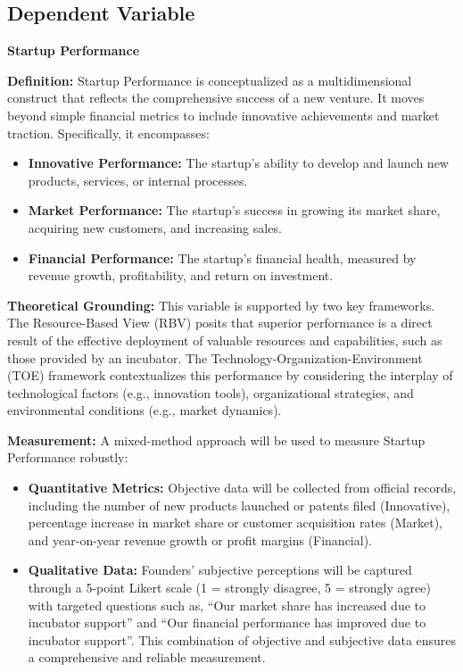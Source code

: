 \documentclass[../Main.tex]{subfiles}
\begin{document}
    \subsection{Dependent Variable}
    
    \textbf{Startup Performance}
    
    \textbf{Definition:} Startup Performance is conceptualized as a multidimensional construct that reflects the comprehensive success of a new venture. It moves beyond simple financial metrics to include innovative achievements and market traction. Specifically, it encompasses:
    
    \begin{itemize}
        \item \textbf{Innovative Performance:} The startup's ability to develop and launch new products, services, or internal processes.
        \item \textbf{Market Performance:} The startup's success in growing its market share, acquiring new customers, and increasing sales.
        \item \textbf{Financial Performance:} The startup's financial health, measured by revenue growth, profitability, and return on investment.
    \end{itemize}
    
    \textbf{Theoretical Grounding:} This variable is supported by two key frameworks. The Resource-Based View (RBV) posits that superior performance is a direct result of the effective deployment of valuable resources and capabilities, such as those provided by an incubator. The Technology-Organization-Environment (TOE) framework contextualizes this performance by considering the interplay of technological factors (e.g., innovation tools), organizational strategies, and environmental conditions (e.g., market dynamics).
    
    \textbf{Measurement:} A mixed-method approach will be used to measure Startup Performance robustly:
    
    \begin{itemize}
        \item \textbf{Quantitative Metrics:} Objective data will be collected from official records, including the number of new products launched or patents filed (Innovative), percentage increase in market share or customer acquisition rates (Market), and year-on-year revenue growth or profit margins (Financial).
        \item \textbf{Qualitative Data:} Founders' subjective perceptions will be captured through a 5-point Likert scale (1 = strongly disagree, 5 = strongly agree) with targeted questions such as, ``Our market share has increased due to incubator support'' and ``Our financial performance has improved due to incubator support''. This combination of objective and subjective data ensures a comprehensive and reliable measurement.
    \end{itemize}
    
\end{document}
